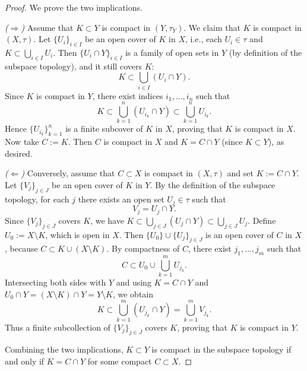 \documentclass[12pt]{article}
\renewcommand{\(}{\left(}%
\renewcommand{\)}{\right)}%
\renewcommand{\[}{\left[}%
\renewcommand{\]}{\right]}%
\newtheorem{proof}{Proof.}}
\begin{document}
\begin{proof}
We prove the two implications.

\noindent\emph{($\Rightarrow$)} Assume that $K\subset Y$ is compact in $(Y,\tau_Y)$. 
We claim that $K$ is compact in $(X,\tau)$. 
Let $\{U_i\}_{i\in I}$ be an open cover of $K$ in $X$, i.e., each $U_i\in\tau$ and $K\subset\bigcup_{i\in I}U_i$. 
Then $\{U_i\cap Y\}_{i\in I}$ is a family of open sets in $Y$ (by definition of the subspace topology), and it still covers $K$:
\begin{equation*}
K\subset \bigcup_{i\in I}(U_i\cap Y).
\end{equation*}
Since $K$ is compact in $Y$, there exist indices $i_1,\dots,i_n$ such that
\begin{equation*}
K\subset \bigcup_{k=1}^n (U_{i_k}\cap Y)\subset \bigcup_{k=1}^n U_{i_k}.
\end{equation*}
Hence $\{U_{i_k}\}_{k=1}^n$ is a finite subcover of $K$ in $X$, proving that $K$ is compact in $X$.
Now take $C:=K$. Then $C$ is compact in $X$ and $K=C\cap Y$ (since $K\subset Y$), as desired.

\noindent\emph{($\Leftarrow$)} Conversely, assume that $C\subset X$ is compact in $(X,\tau)$ and set $K:=C\cap Y$. 
Let $\{V_j\}_{j\in J}$ be an open cover of $K$ in $Y$. 
By the definition of the subspace topology, for each $j$ there exists an open set $U_j\in\tau$ such that
\begin{equation*}
V_j = U_j \cap Y.
\end{equation*}
Since $\{V_j\}_{j\in J}$ covers $K$, we have $K\subset \bigcup_{j\in J}(U_j\cap Y)\subset \bigcup_{j\in J}U_j$. 
Define $U_0:=X\setminus K$, which is open in $X$. Then $\{U_0\}\cup\{U_j\}_{j\in J}$ is an open cover of $C$ in $X$, because $C\subset K\cup (X\setminus K)$. 
By compactness of $C$, there exist $j_1,\dots,j_m$ such that
\begin{equation*}
C \subset U_0 \cup \bigcup_{k=1}^m U_{j_k}.
\end{equation*}
Intersecting both sides with $Y$ and using $K=C\cap Y$ and $U_0\cap Y = (X\setminus K)\cap Y = Y\setminus K$, we obtain
\begin{equation*}
K \subset \bigcup_{k=1}^m (U_{j_k}\cap Y)=\bigcup_{k=1}^m V_{j_k}.
\end{equation*}
Thus a finite subcollection of $\{V_j\}_{j\in J}$ covers $K$, proving that $K$ is compact in $Y$.

Combining the two implications, $K\subset Y$ is compact in the subspace topology if and only if $K=C\cap Y$ for some compact $C\subset X$.
\end{proof}
\end{document}
